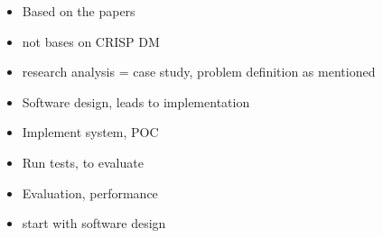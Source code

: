 
\begin{itemize}
\item Based on the papers
\item not bases on CRISP DM 
\item research analysis = case study, problem definition as mentioned
\item Software design, leads to implementation
\item Implement system, POC
\item Run tests, to evaluate
\item Evaluation, performance
\item start with software design
\end{itemize}
